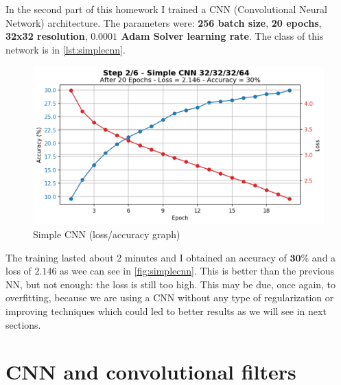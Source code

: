 \documentclass[a4paper, 11pt]{article}
\begin{document}
	
	In the second part of this homework I trained a CNN (Convolutional Neural Network) architecture. The parameters were: \textbf{256 batch size}, \textbf{20 epochs}, \textbf{32x32 resolution}, \textbf{$\boldsymbol{0.0001}$ Adam Solver learning rate}. The class of this network is in \vref{lst:simplecnn}.
	
	\newpage
	\begin{figure}[ht!]
		\centering
		\includegraphics[width=0.65\paperwidth]{img/fig02.png}
		\caption{Simple CNN (loss/accuracy graph)}
		\label{fig:simplecnn}
	\end{figure}

	The training lasted about 2 minutes and I obtained an accuracy of $\boldsymbol{30\%}$ and a loss of $\boldsymbol{2.146}$ as wee can see in \vref{fig:simplecnn}.
	This is better than the previous NN, but not enough: the loss is still too high. This may be due, once again, to overfitting, because we are using a CNN without any type of regularization or improving techniques which could led to better results as we will see in next sections.
	
	
	\section{CNN and convolutional filters}
	
\end{document}
